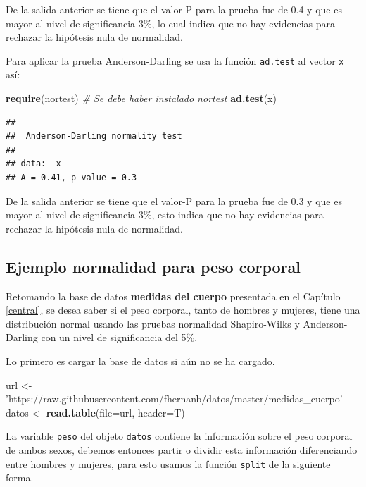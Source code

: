 \documentclass[10pt,]{krantz}
\makeatletter
\newenvironment{Shaded}{\begin{snugshade}}{\end{snugshade}}
\newcommand{\KeywordTok}[1]{\textcolor[rgb]{0.13,0.29,0.53}{\textbf{{#1}}}}
\newcommand{\DataTypeTok}[1]{\textcolor[rgb]{0.13,0.29,0.53}{{#1}}}
\newcommand{\StringTok}[1]{\textcolor[rgb]{0.31,0.60,0.02}{{#1}}}
\newcommand{\CommentTok}[1]{\textcolor[rgb]{0.56,0.35,0.01}{\textit{{#1}}}}
\newcommand{\NormalTok}[1]{{#1}}
\newenvironment{kframe}{%
\medskip{}
\setlength{\fboxsep}{.8em}
 \def\at@end@of@kframe{}%
 \ifinner\ifhmode%
  \def\at@end@of@kframe{\end{minipage}}%
  \begin{minipage}{\columnwidth}%
 \fi\fi%
 \def\FrameCommand##1{\hskip\@totalleftmargin \hskip-\fboxsep
 \colorbox{shadecolor}{##1}\hskip-\fboxsep
     \hskip-\linewidth \hskip-\@totalleftmargin \hskip\columnwidth}%
 \MakeFramed {\advance\hsize-\width
   \@totalleftmargin\z@ \linewidth\hsize
   \@setminipage}}%
 {\par\unskip\endMakeFramed%
 \at@end@of@kframe}
\renewenvironment{Shaded}{\begin{kframe}}{\end{kframe}}
\makeatother
\begin{document}
De la salida anterior se tiene que el valor-P para la prueba fue de 0.4
y que es mayor al nivel de significancia 3\%, lo cual indica que no hay
evidencias para rechazar la hipótesis nula de normalidad.

Para aplicar la prueba Anderson-Darling se usa la función
\texttt{ad.test} al vector \texttt{x} así:

\begin{Shaded}
\begin{Highlighting}[]
\KeywordTok{require}\NormalTok{(nortest)  }\CommentTok{# Se debe haber instalado nortest}
\KeywordTok{ad.test}\NormalTok{(x)}
\end{Highlighting}
\end{Shaded}

\begin{verbatim}
## 
##  Anderson-Darling normality test
## 
## data:  x
## A = 0.41, p-value = 0.3
\end{verbatim}

De la salida anterior se tiene que el valor-P para la prueba fue de 0.3
y que es mayor al nivel de significancia 3\%, esto indica que no hay
evidencias para rechazar la hipótesis nula de normalidad.

\subsection*{Ejemplo normalidad para peso
corporal}\label{ejemplo-normalidad-para-peso-corporal}


Retomando la base de datos \textbf{medidas del cuerpo} presentada en el
Capítulo \ref{central}, se desea saber si el peso corporal, tanto de
hombres y mujeres, tiene una distribución normal usando las pruebas
normalidad Shapiro-Wilks y Anderson-Darling con un nivel de
significancia del 5\%.

Lo primero es cargar la base de datos si aún no se ha cargado.

\begin{Shaded}
\begin{Highlighting}[]
\NormalTok{url <-}\StringTok{ 'https://raw.githubusercontent.com/fhernanb/datos/master/medidas_cuerpo'}
\NormalTok{datos <-}\StringTok{ }\KeywordTok{read.table}\NormalTok{(}\DataTypeTok{file=}\NormalTok{url, }\DataTypeTok{header=}\NormalTok{T)}
\end{Highlighting}
\end{Shaded}

La variable \texttt{peso} del objeto \texttt{datos} contiene la
información sobre el peso corporal de ambos sexos, debemos entonces
partir o dividir esta información diferenciando entre hombres y mujeres,
para esto usamos la función \texttt{split} de la siguiente forma.
\end{document}
